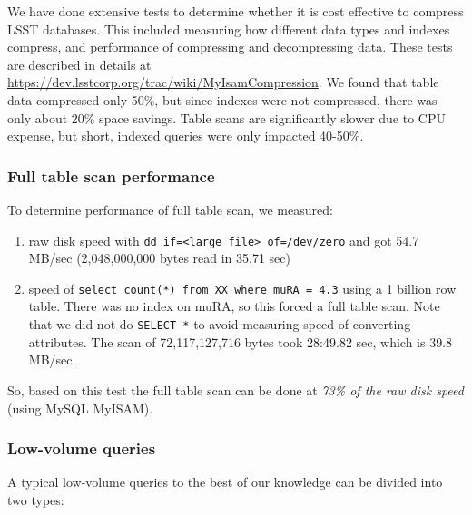 \documentclass[DM,lsstdraft,toc]{lsstdoc}
\begin{document}
We have done extensive tests to determine whether it is cost effective
to compress LSST databases. This included measuring how different data
types and indexes compress, and performance of compressing and
decompressing data. These tests are described in details at
\url{https://dev.lsstcorp.org/trac/wiki/MyIsamCompression}. We found
that table data compressed only 50\%, but since indexes were not
compressed, there was only about 20\% space savings. Table scans are
significantly slower due to CPU expense, but short, indexed queries were
only impacted 40-50\%.

\subsubsection{Full table scan
performance}\label{full-table-scan-performance}

To determine performance of full table scan, we measured:

\begin{enumerate}
\def\labelenumi{\arabic{enumi}.}
\item
  raw disk speed with
  \texttt{dd\ if=\textless{}large\ file\textgreater{}\ of=/dev/zero} and
  got 54.7 MB/sec (2,048,000,000 bytes read in 35.71 sec)
\item
  speed of \texttt{select\ count(*)\ from\ XX\ where\ muRA\ =\ 4.3}
  using a 1 billion row table. There was no index on muRA, so this
  forced a full table scan. Note that we did not do \texttt{SELECT\ *}
  to avoid measuring speed of converting attributes. The scan of
  72,117,127,716 bytes took 28:49.82 sec, which is 39.8 MB/sec.
\end{enumerate}

So, based on this test the full table scan can be done at \emph{73\% of
the raw disk speed} (using MySQL MyISAM).

\subsubsection{Low-volume queries}\label{low-volume-queries}

A typical low-volume queries to the best of our knowledge can be divided
into two types:
\end{document}
